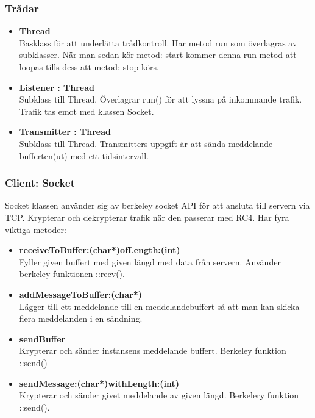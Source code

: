\documentclass[10pt, titlepage, oneside, a4paper]{article}
\begin{document}
    		\newpage
    		\subsubsection{Trådar}
    		\begin{itemize}
    			\item\textbf{Thread}\\Basklass för att underlätta trådkontroll. Har metod run som överlagras av subklasser. När man sedan kör metod: start kommer denna run metod att loopas tills dess att metod: stop körs.
    			
    			\item\textbf{Listener : Thread}\\Subklass till Thread. Överlagrar run() för att lyssna på inkommande trafik. Trafik tas emot med klassen Socket. 
    			\item\textbf{Transmitter : Thread}\\Subklass till Thread. Transmitters uppgift är att sända meddelande bufferten(ut) med ett tidsintervall. 
    		\end{itemize}
    		\subsubsection{Client: Socket}
    		Socket klassen använder sig av berkeley socket API för att ansluta till servern via TCP. Krypterar och dekrypterar trafik när den passerar med RC4. Har fyra viktiga metoder:
    		\begin{itemize}
    			\item\textbf{receiveToBuffer:(char*)ofLength:(int)}\\
    			Fyller given buffert med given längd med data från servern. Använder berkeley funktionen ::recv().
    			
    			\item\textbf{addMessageToBuffer:(char*)}\\Lägger till ett meddelande till en meddelandebuffert så att man kan skicka flera meddelanden i en sändning. 
    			\item\textbf{sendBuffer}\\Krypterar och sänder instansens meddelande buffert. Berkeley funktion ::send()
    			\item\textbf{sendMessage:(char*)withLength:(int)}\\Krypterar och sänder givet meddelande av given längd. Berkelery funktion ::send().
    		\end{itemize}
    		
\end{document}
